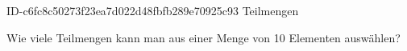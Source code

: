 \begin{exercise}
      {ID-c6fc8c50273f23ea7d022d48fbfb289e70925c93}
      {Teilmengen}
  \ifproblem\problem\par
    Wie viele Teilmengen kann man aus einer Menge von 10 Elementen auswählen?
  \fi
\end{exercise}
